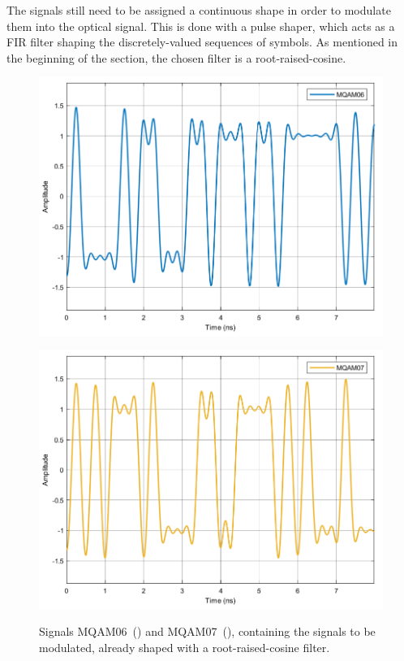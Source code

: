 	The signals still need to be assigned a continuous shape in order to modulate 
	them into the optical signal. This is done with a pulse shaper, which acts as 
	a 
	FIR filter shaping the discretely-valued sequences of symbols. As mentioned 
	in the beginning of the section, the chosen filter is a root-raised-cosine.

	\begin{figure}[H]
	\centering
	\begin{minipage}{0.45\textwidth}
		\centering
		\includegraphics[width=1\textwidth]		
		{./sdf/m_qam_system/figures/simulations/01_noISI/MQAM06.pdf}
		\subcaption{}\label{fig:ISImqam6}
	\end{minipage}
	\begin{minipage}{0.45\textwidth}
		\centering
		\includegraphics[width=1\textwidth]
		{sdf/m_qam_system/figures/simulations/01_noISI/MQAM07.pdf}
		\subcaption{}\label{fig:ISImqam7}
	\end{minipage}
	\caption{Signals MQAM06~() and 
	MQAM07~(), 
		containing the signals to be modulated, already shaped with a 
		root-raised-cosine filter.}
\end{figure}

